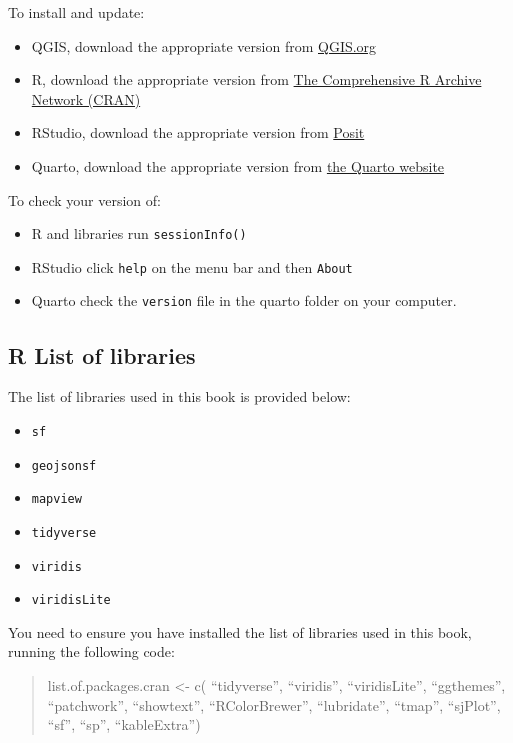 \documentclass[
  letterpaper,
  DIV=11,
  numbers=noendperiod]{scrreprt}
\providecommand{\tightlist}{%
  \setlength{\itemsep}{0pt}\setlength{\parskip}{0pt}}\usepackage{longtable,booktabs,array}
\begin{document}
To install and update:

\begin{itemize}
\tightlist
\item
  QGIS, download the appropriate version from
  \href{https://www.qgis.org/en/site/forusers/download.html}{QGIS.org}
\item
  R, download the appropriate version from
  \href{https://cran.r-project.org}{The Comprehensive R Archive Network
  (CRAN)}
\item
  RStudio, download the appropriate version from
  \href{https://posit.co/download/rstudio-desktop/}{Posit}
\item
  Quarto, download the appropriate version from
  \href{https://quarto.org/docs/get-started/}{the Quarto website}
\end{itemize}

To check your version of:

\begin{itemize}
\tightlist
\item
  R and libraries run \texttt{sessionInfo()}
\item
  RStudio click \texttt{help} on the menu bar and then \texttt{About}
\item
  Quarto check the \texttt{version} file in the quarto folder on your
  computer.
\end{itemize}

\hypertarget{r-list-of-libraries}{%
\subsection*{R List of libraries}\label{r-list-of-libraries}}

The list of libraries used in this book is provided below:

\begin{itemize}
\tightlist
\item
  \texttt{sf}
\item
  \texttt{geojsonsf}
\item
  \texttt{mapview}
\item
  \texttt{tidyverse}
\item
  \texttt{viridis}
\item
  \texttt{viridisLite}
\end{itemize}

You need to ensure you have installed the list of libraries used in this
book, running the following code:

\begin{quote}
list.of.packages.cran \textless- c( ``tidyverse'', ``viridis'',
``viridisLite'', ``ggthemes'', ``patchwork'', ``showtext'',
``RColorBrewer'', ``lubridate'', ``tmap'', ``sjPlot'', ``sf'', ``sp'',
``kableExtra'')
\end{quote}
\end{document}
